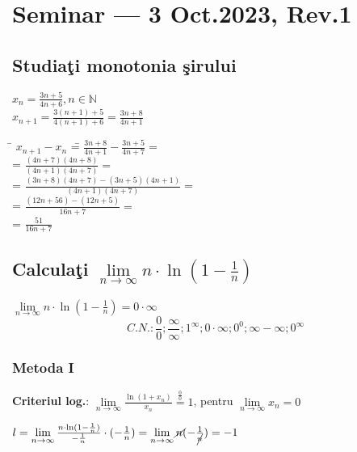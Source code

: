 \documentclass[a4paper, 12pt, notitlepage]{book}
\begin{document}


    \newcommand\revstr{Rev.\@ 1}
    \chapter{Seminar --- 3 Oct.\@ 2023, \revstr}

    \section{Studia\c{t}i monotonia \c{s}irului}
    $x_{n} = \frac{3n+5}{4n+6}, n \in \mathbb{N}$\\[5pt]
    $x_{n+1} = \frac{3(n+1)+5}{4(n+1)+6} = \frac{3n+8}{4n+1}$
    \begin{tabbing}
      \= $x_{n+1} - x_{n}$ \= = $\frac{3n+8}{4n+1} - \frac{3n+5}{4n+7} =$\\[2pt]
      \>  \> = $\frac{(4n+7)(4n+8)}{(4n+1)(4n+7)} =$\\[2pt] %
      \>  \> = $\frac{(3n+8)(4n+7) - (3n+5)(4n+1)}{(4n+1)(4n+7)} =$\\[2pt]
      \>  \> = $\frac{(12n+56)-(12n+5)}{16n+7} =$\\[2pt]
      \>  \> = $\frac{51}{16n+7}$\\[2pt]
    \end{tabbing}

    \section{Calcula\c{t}i $\lim\limits_{n\to\infty} n \cdot \ln{(1-\frac{1}{n})}$}
    $\lim\limits_{n\to\infty} n \cdot \ln{(1-\frac{1}{n})} = 0 \cdot \infty$
    \[
      C.N.: \frac{0}{0}; \frac{\infty}{\infty}; 1^{\infty}; 0 \cdot \infty; 0^{0}; \infty - \infty; 0^{\infty}
    \]
    \subsection{Metoda I}
        \begin{center}
          \textbf{Criteriul log.}:
          $\lim\limits_{n\to\infty} \frac{\ln(1+x_{n})}{x_{n}} \stackrel{\frac{0}{0}}{=} 1$, pentru $\lim\limits_{n\to\infty}x_{n}=0$\\[5pt]
        \end{center}
        $l = \lim\limits_{n\to\infty}\frac{n \cdot \ln(1-\frac{1}{n})}{-\frac{1}{n}} \cdot (-\frac{1}{n}) = \lim\limits_{n\to\infty} \cancel{n} (-\frac{1}{\cancel{n}}) = -1$\\[5pt]
\end{document}
